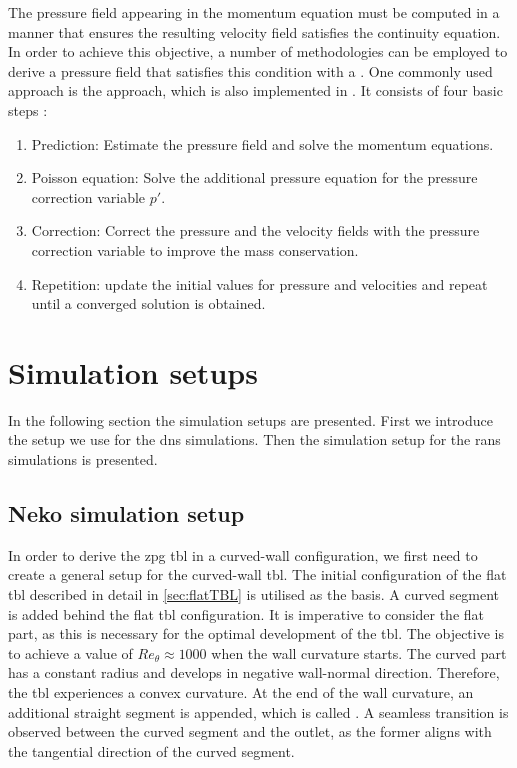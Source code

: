 The pressure field appearing in the momentum equation must be computed in a manner that ensures the resulting velocity field satisfies the continuity equation.
In order to achieve this objective, a number of methodologies can be employed to derive a pressure field that satisfies this condition with a  \citep{schlatter_lecture_2025, weller_tensorial_1998}.
One commonly used approach is the  approach, which is also implemented in .
It consists of four basic steps \citep{schlatter_lecture_2025}:
\begin{enumerate}
    \item Prediction: Estimate the pressure field and solve the momentum equations.
    \item Poisson equation: Solve the additional pressure equation for the pressure correction variable $p'$.
    \item Correction: Correct the pressure and the velocity fields with the pressure correction variable to improve the mass conservation.
    \item Repetition: update the initial values for pressure and velocities and repeat until a converged solution is obtained.
\end{enumerate}


\section{Simulation setups}\label{sec:MethodCurvedTBL}

In the following section the simulation setups are presented.
First we introduce the setup we use for the \acrshort{dns} simulations.
Then the simulation setup for the \acrshort{rans} simulations is presented.

\subsection{Neko simulation setup}

In order to derive the \acrshort{zpg} \acrshort{tbl} in a curved-wall configuration, we first need to create a general setup for the curved-wall \acrshort{tbl}. 
The initial configuration of the flat \acrshort{tbl} described in detail in \autoref{sec:flatTBL} is utilised as the basis.
A curved segment is added behind the flat \acrshort{tbl} configuration.
It is imperative to consider the flat part, as this is necessary for the optimal development of the \acrshort{tbl}. The objective is to achieve
a value of $Re_{\theta} \approx 1000$ when the wall curvature starts. 
The curved part has a constant radius and develops in negative wall-normal direction. 
Therefore, the \acrshort{tbl} experiences a convex curvature. 
At the end of the wall curvature, an additional straight segment is appended, which is called .
A seamless transition is observed between the curved segment and the outlet, as the former aligns with the tangential direction of the curved segment. 

